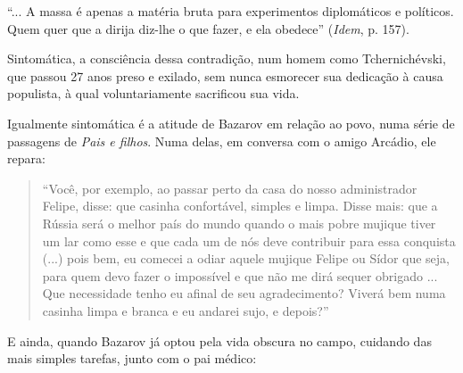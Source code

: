 ``... A massa é apenas a matéria bruta para experimentos diplomáticos e
políticos. Quem quer que a dirija diz-lhe o que fazer, e ela obedece''
(\emph{Idem}, p. 157).

Sintomática, a consciência dessa contradição, num homem como
Tchernichévski, que passou 27 anos preso e exilado, sem nunca esmorecer
sua dedicação à causa populista, à qual voluntariamente sacrificou sua
vida.

Igualmente sintomática é a atitude de Bazarov em relação ao povo, numa
série de passagens de \emph{Pais e filhos}. Numa delas, em conversa com
o amigo Arcádio, ele repara:

\begin{quote}
``Você, por exemplo, ao passar perto da casa do nosso administrador
Felipe, disse: que casinha confortável, simples e limpa. Disse mais: que
a Rússia será o melhor país do mundo quando o mais pobre mujique tiver
um lar como esse e que cada um de nós deve contribuir para essa
conquista (...) pois bem, eu comecei a odiar aquele mujique Felipe ou
Sídor que seja, para quem devo fazer o impossível e que não me dirá
sequer obrigado ... Que necessidade tenho eu afinal de seu
agradecimento? Viverá bem numa casinha limpa e branca e eu andarei sujo,
e depois?''
\end{quote}

E ainda, quando Bazarov já optou pela vida obscura no campo, cuidando
das mais simples tarefas, junto com o pai médico:

